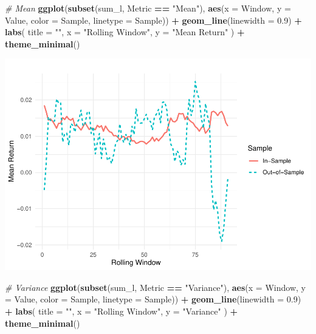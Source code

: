 \documentclass[
  12pt,
]{article}
\newenvironment{Shaded}{\begin{snugshade}}{\end{snugshade}}
\newcommand{\AttributeTok}[1]{\textcolor[rgb]{0.13,0.29,0.53}{#1}}
\newcommand{\CommentTok}[1]{\textcolor[rgb]{0.56,0.35,0.01}{\textit{#1}}}
\newcommand{\FloatTok}[1]{\textcolor[rgb]{0.00,0.00,0.81}{#1}}
\newcommand{\FunctionTok}[1]{\textcolor[rgb]{0.13,0.29,0.53}{\textbf{#1}}}
\newcommand{\NormalTok}[1]{#1}
\newcommand{\SpecialCharTok}[1]{\textcolor[rgb]{0.81,0.36,0.00}{\textbf{#1}}}
\newcommand{\StringTok}[1]{\textcolor[rgb]{0.31,0.60,0.02}{#1}}
\begin{document}
\begin{Shaded}
\begin{Highlighting}[]
\CommentTok{\# Mean}
\FunctionTok{ggplot}\NormalTok{(}\FunctionTok{subset}\NormalTok{(sum\_l, Metric }\SpecialCharTok{==} \StringTok{"Mean"}\NormalTok{),}
       \FunctionTok{aes}\NormalTok{(}\AttributeTok{x =}\NormalTok{ Window, }\AttributeTok{y =}\NormalTok{ Value, }\AttributeTok{color =}\NormalTok{ Sample, }\AttributeTok{linetype =}\NormalTok{ Sample)) }\SpecialCharTok{+}
  \FunctionTok{geom\_line}\NormalTok{(}\AttributeTok{linewidth =} \FloatTok{0.9}\NormalTok{) }\SpecialCharTok{+}
  \FunctionTok{labs}\NormalTok{(}
    \AttributeTok{title =} \StringTok{""}\NormalTok{,}
    \AttributeTok{x =} \StringTok{"Rolling Window"}\NormalTok{,}
    \AttributeTok{y =} \StringTok{"Mean Return"}
\NormalTok{  ) }\SpecialCharTok{+}
  \FunctionTok{theme\_minimal}\NormalTok{()}
\end{Highlighting}
\end{Shaded}

\includegraphics{NDXNES005_A2_RMD_files/figure-latex/unnamed-chunk-10-1.pdf}

\begin{Shaded}
\begin{Highlighting}[]
\CommentTok{\# Variance }
\FunctionTok{ggplot}\NormalTok{(}\FunctionTok{subset}\NormalTok{(sum\_l, Metric }\SpecialCharTok{==} \StringTok{"Variance"}\NormalTok{),}
       \FunctionTok{aes}\NormalTok{(}\AttributeTok{x =}\NormalTok{ Window, }\AttributeTok{y =}\NormalTok{ Value, }\AttributeTok{color =}\NormalTok{ Sample, }\AttributeTok{linetype =}\NormalTok{ Sample)) }\SpecialCharTok{+}
  \FunctionTok{geom\_line}\NormalTok{(}\AttributeTok{linewidth =} \FloatTok{0.9}\NormalTok{) }\SpecialCharTok{+}
  \FunctionTok{labs}\NormalTok{(}
    \AttributeTok{title =} \StringTok{""}\NormalTok{,}
    \AttributeTok{x =} \StringTok{"Rolling Window"}\NormalTok{,}
    \AttributeTok{y =} \StringTok{"Variance"}
\NormalTok{  ) }\SpecialCharTok{+}
  \FunctionTok{theme\_minimal}\NormalTok{()}
\end{Highlighting}
\end{Shaded}
\end{document}
